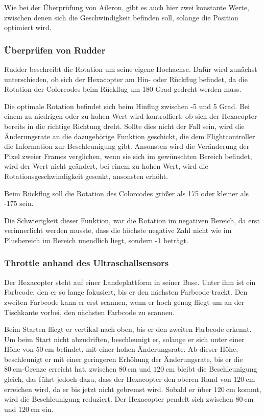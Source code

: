     Wie bei der Überprüfung von Aileron, gibt es auch hier zwei konstante Werte, zwischen denen sich die Geschwindigkeit befinden soll, solange die Position optimiert wird.

    \subsubsection{Überprüfen von Rudder}
    Rudder beschreibt die Rotation um seine eigene Hochachse. Dafür wird zunächst unterschieden, ob sich der Hexacopter am Hin- oder Rückflug befindet, da die Rotation der Colorcodes beim Rückflug um 180 Grad gedreht werden muss.

    Die optimale Rotation befindet sich beim Hinflug zwischen -5 und 5 Grad.
    Bei einem zu niedrigen oder zu hohen Wert wird kontrolliert, ob sich der Hexacopter bereits in die richtige Richtung dreht.
    Sollte dies nicht der Fall sein, wird die Änderungsrate an die dazugehörige Funktion geschickt, die dem Flightcontroller die Information zur Beschleunigung gibt.
    Ansonsten wird die Veränderung der Pixel zweier Frames verglichen, wenn sie sich im gewünschten Bereich befindet, wird der Wert nicht geändert, bei einem zu hohen Wert, wird die Rotationsgeschwindigkeit gesenkt, ansonsten erhöht.

    Beim Rückflug soll die Rotation des Colorcodes größer als 175 oder kleiner als -175 sein.

    Die Schwierigkeit dieser Funktion, war die Rotation im negativen Bereich, da erst verinnerlicht werden musste, dass die höchste negative Zahl nicht wie im Plusbereich im Bereich unendlich liegt, sondern -1 beträgt.


    \subsubsection{Throttle anhand des Ultraschallsensors}
    Der Hexacopter steht auf einer Landeplattform in seiner Base. Unter ihm ist ein Farbcode, den er so lange fokusiert, bis er den nächsten Farbcode trackt. Den zweiten Farbcode kann er erst scannen, wenn er hoch genug fliegt um an der Tischkante vorbei, den nächsten Farbcode zu scannen.

    Beim Starten fliegt er vertikal nach oben, bis er den zweiten Farbcode erkennt. Um beim Start nicht abzudriften, beschleunigt er, solange er sich unter einer Höhe von $\SI{50}{\centi\metre}$ befindet, mit einer hohen Änderungsrate. Ab dieser Höhe, beschleunigt er mit einer geringeren Erhöhung der Änderungsrate, bis er die $\SI{80}{\centi\metre}$-Grenze erreicht hat.
    zwischen $\SI{80}{\centi\metre}$ und $\SI{120}{\centi\metre}$ bleibt die Beschleunigung gleich, das führt jedoch dazu, dass der Hexacopter den oberen Rand von $\SI{120}{\centi\metre}$ erreichen wird, da er bis jetzt nicht gebremst wird. Sobald er über $\SI{120}{\centi\metre}$ kommt, wird die Beschleunigung reduziert. Der Hexacopter pendelt sich zwischen $\SI{80}{\centi\metre}$ und $\SI{120}{\centi\metre}$ ein.

